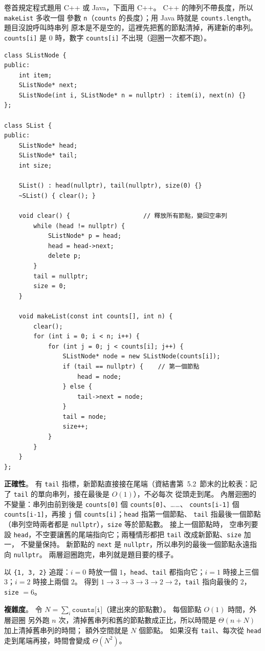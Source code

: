 \begin{pastsoln}
卷首規定程式題用 C++ 或 Java，下面用 C++。 C++ 的陣列不帶長度，所以 \texttt{makeList} 多收一個
參數 \texttt{n}（\texttt{counts} 的長度）；用 Java 時就是 \texttt{counts.length}。 題目沒說呼叫時串列
原本是不是空的，這裡先把舊的節點清掉，再建新的串列。 \texttt{counts[i]} 是 $0$ 時，數字 \texttt{counts[i]}
不出現（迴圈一次都不跑）。

\begin{verbatim}
class SListNode {
public:
    int item;
    SListNode* next;
    SListNode(int i, SListNode* n = nullptr) : item(i), next(n) {}
};

class SList {
public:
    SListNode* head;
    SListNode* tail;
    int size;

    SList() : head(nullptr), tail(nullptr), size(0) {}
    ~SList() { clear(); }

    void clear() {                    // 釋放所有節點，變回空串列
        while (head != nullptr) {
            SListNode* p = head;
            head = head->next;
            delete p;
        }
        tail = nullptr;
        size = 0;
    }

    void makeList(const int counts[], int n) {
        clear();
        for (int i = 0; i < n; i++) {
            for (int j = 0; j < counts[i]; j++) {
                SListNode* node = new SListNode(counts[i]);
                if (tail == nullptr) {    // 第一個節點
                    head = node;
                } else {
                    tail->next = node;
                }
                tail = node;
                size++;
            }
        }
    }
};
\end{verbatim}

\textbf{正確性}。 有 \texttt{tail} 指標，新節點直接接在尾端（資結書第~5.2~節末的比較表：記了 \texttt{tail} 的單向串列，接在最後是 $O(1)$），不必每次
從頭走到尾。 內層迴圈的不變量：串列由前到後是 \texttt{counts[0]} 個 \texttt{counts[0]}、……、
\texttt{counts[i-1]} 個 \texttt{counts[i-1]}，再接 \texttt{j} 個 \texttt{counts[i]}；\texttt{head} 指第一個節點、
\texttt{tail} 指最後一個節點（串列空時兩者都是 \texttt{nullptr}），\texttt{size} 等於節點數。 接上一個節點時，
空串列要設 \texttt{head}，不空要讓舊的尾端指向它；兩種情形都把 \texttt{tail} 改成新節點、\texttt{size} 加一，
不變量保持。 新節點的 \texttt{next} 是 \texttt{nullptr}，所以串列的最後一個節點永遠指向 \texttt{nullptr}。
兩層迴圈跑完，串列就是題目要的樣子。

以 \texttt{\{1, 3, 2\}} 追蹤：$i = 0$ 時放一個 $1$，\texttt{head}、\texttt{tail} 都指向它；$i = 1$ 時接上三個
$3$；$i = 2$ 時接上兩個 $2$。 得到 $1 \to 3 \to 3 \to 3 \to 2 \to 2$，\texttt{tail} 指向最後的 $2$，
\texttt{size} $= 6$。

\textbf{複雜度}。 令 $N = \sum_i \texttt{counts[i]}$（建出來的節點數）。 每個節點 $O(1)$ 時間，外層迴圈
另外跑 $n$ 次，清掉舊串列和舊的節點數成正比，所以時間是 $\Theta(n + N)$ 加上清掉舊串列的時間；
額外空間就是 $N$ 個節點。 如果沒有 \texttt{tail}、每次從 \texttt{head} 走到尾端再接，時間會變成
$\Theta(N^2)$。
\end{pastsoln}
